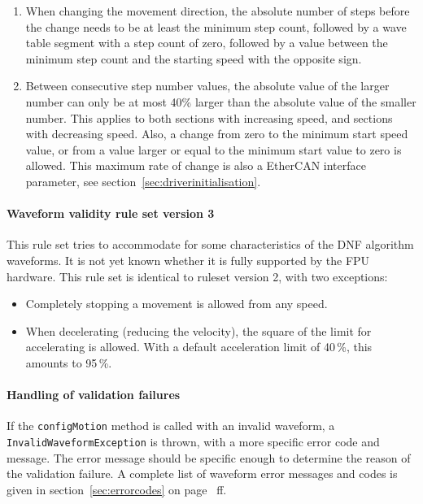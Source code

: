 \documentclass[11pt,a4paper]{scrartcl}
\begin{document}
\begin{enumerate}
\item When changing the movement direction, the absolute number of
  steps before the change needs to be at least the minimum step count,
  followed by a wave table segment with a step count of zero, followed
  by a value between the minimum step count and the starting speed
  with the opposite sign.

\item Between consecutive step number values, the absolute value of
  the larger number can only be at most 40\% larger than the absolute
  value of the smaller number. This applies to both sections with
  increasing speed, and sections with decreasing speed. Also, a change
  from zero to the minimum start speed value, or from a value larger
  or equal to the minimum start value to zero is allowed. This maximum
  rate of change is also a EtherCAN interface parameter, see
  section~\ref{sec:driverinitialisation}.

  
\end{enumerate}

\paragraph{Waveform validity rule set version 3}

This rule set tries to accommodate for some characteristics of the DNF
algorithm waveforms. It is not yet known whether it is fully supported
by the FPU hardware. This rule set is identical to ruleset version 2,
with two exceptions:

\begin{itemize}
\item Completely stopping a movement is allowed from any speed.
\item When decelerating (reducing the velocity), the square of
  the limit for accelerating is allowed. With a default
  acceleration limit of 40\,\%, this amounts to 95\,\%.
\end{itemize}


\paragraph{Handling of validation failures}

\begin{sloppypar}
If the \texttt{configMotion} method is called with an invalid
waveform, a \texttt{InvalidWaveformException} is thrown, with a more
specific error code and message. The error message should be specific
enough to determine the reason of the validation failure.  A complete
list of waveform error messages and codes is given in
section~\ref{sec:errorcodes} on page~\pageref{sec:errorcodes} ff.
\end{sloppypar}
\end{document}
